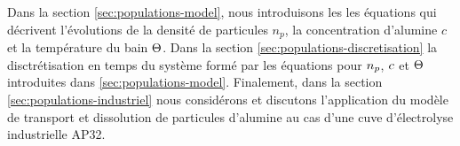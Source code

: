 Dans la section \ref{sec:populations-model}, nous introduisons les
les équations qui décrivent l'évolutions de la densité de
particules $n_p$, la concentration d'alumine $c$ et la température
du bain $\Theta$. Dans la section
\ref{sec:populations-discretisation} la disctrétisation en temps du
système formé par les équations pour $n_p$, $c$
et $\Theta$ introduites dans
\ref{sec:populations-model}. Finalement, dans la section
\ref{sec:populations-industriel} nous considérons et discutons
l'application du modèle de transport et dissolution de particules
d'alumine au cas d'une cuve d'électrolyse industrielle AP32.
